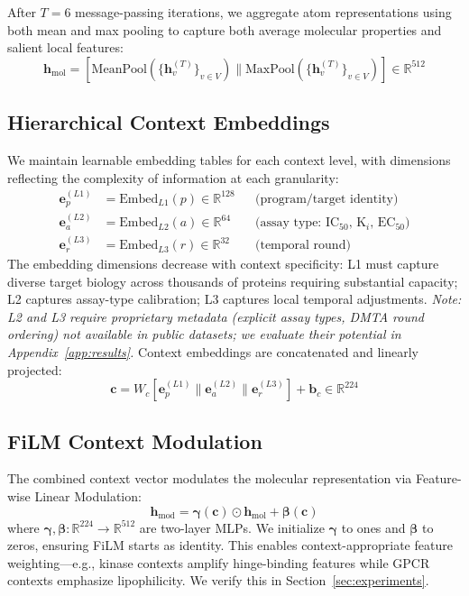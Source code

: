 \documentclass[sigconf,anonymous]{acmart}
\newcommand{\hmol}{\mathbf{h}_{\text{mol}}}
\newcommand{\hmod}{\mathbf{h}_{\text{mod}}}
\begin{document}
After $T=6$ message-passing iterations, we aggregate atom representations using both mean and max pooling to capture both average molecular properties and salient local features:
\begin{equation}
    \hmol = [\text{MeanPool}(\{\mathbf{h}_v^{(T)}\}_{v \in V}) \| \text{MaxPool}(\{\mathbf{h}_v^{(T)}\}_{v \in V})] \in \mathbb{R}^{512}
\end{equation}

\subsection{Hierarchical Context Embeddings}

We maintain learnable embedding tables for each context level, with dimensions reflecting the complexity of information at each granularity:
\begin{align}
    \mathbf{e}_p^{(L1)} &= \text{Embed}_{L1}(p) \in \mathbb{R}^{128} && \text{(program/target identity)} \\
    \mathbf{e}_a^{(L2)} &= \text{Embed}_{L2}(a) \in \mathbb{R}^{64} && \text{(assay type: IC$_{50}$, K$_i$, EC$_{50}$)} \\
    \mathbf{e}_r^{(L3)} &= \text{Embed}_{L3}(r) \in \mathbb{R}^{32} && \text{(temporal round)}
\end{align}
The embedding dimensions decrease with context specificity: L1 must capture diverse target biology across thousands of proteins requiring substantial capacity; L2 captures assay-type calibration; L3 captures local temporal adjustments. \textit{Note: L2 and L3 require proprietary metadata (explicit assay types, DMTA round ordering) not available in public datasets; we evaluate their potential in Appendix~\ref{app:results}.} Context embeddings are concatenated and linearly projected:
\begin{equation}
    \mathbf{c} = W_c [\mathbf{e}_p^{(L1)} \| \mathbf{e}_a^{(L2)} \| \mathbf{e}_r^{(L3)}] + \mathbf{b}_c \in \mathbb{R}^{224}
\end{equation}

\subsection{FiLM Context Modulation}

The combined context vector modulates the molecular representation via Feature-wise Linear Modulation:
\begin{equation}
    \hmod = \boldsymbol{\gamma}(\mathbf{c}) \odot \hmol + \boldsymbol{\beta}(\mathbf{c})
    \label{eq:film}
\end{equation}
where $\boldsymbol{\gamma}, \boldsymbol{\beta}: \mathbb{R}^{224} \rightarrow \mathbb{R}^{512}$ are two-layer MLPs. We initialize $\boldsymbol{\gamma}$ to ones and $\boldsymbol{\beta}$ to zeros, ensuring FiLM starts as identity. This enables context-appropriate feature weighting---e.g., kinase contexts amplify hinge-binding features while GPCR contexts emphasize lipophilicity. We verify this in Section~\ref{sec:experiments}.
\end{document}
